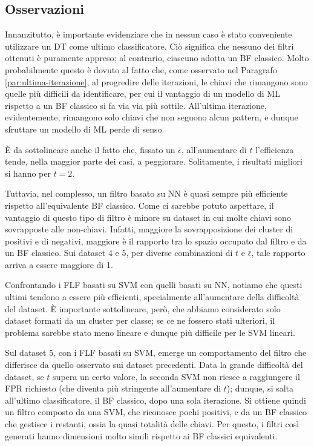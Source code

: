 \subsection{Osservazioni}

Innanzitutto, è importante evidenziare che in nessun caso è stato conveniente utilizzare un DT come ultimo classificatore. Ciò significa che nessuno dei filtri ottenuti è puramente appreso; al contrario, ciascuno adotta un BF classico. Molto probabilmente questo è dovuto al fatto che, come osservato nel Paragrafo \ref{par:ultima-iterazione}, al progredire delle iterazioni, le chiavi che rimangono sono quelle più difficili da identificare, per cui il vantaggio di un modello di ML rispetto a un BF classico si fa via via più sottile. All'ultima iterazione, evidentemente, rimangono solo chiavi che non seguono alcun pattern, e dunque sfruttare un modello di ML perde di senso.

È da sottolineare anche il fatto che, fissato un $\bar \epsilon$, all'aumentare di $t$ l'efficienza tende, nella maggior parte dei casi, a peggiorare. Solitamente, i risultati migliori si hanno per $t=2$.

Tuttavia, nel complesso, un filtro basato su NN è quasi sempre più efficiente rispetto all'equivalente BF classico. Come ci sarebbe potuto aspettare, il vantaggio di questo tipo di filtro è minore su dataset in cui molte chiavi sono sovrapposte alle non-chiavi. Infatti, maggiore la sovrapposizione dei cluster di positivi e di negativi, maggiore è il rapporto tra lo spazio occupato dal filtro e da un BF classico. Sui dataset 4 e 5, per diverse combinazioni di $t$ e $\bar \epsilon$, tale rapporto arriva a essere maggiore di 1.

Confrontando i FLF basati su SVM con quelli basati su NN, notiamo che questi ultimi tendono a essere più efficienti, specialmente all'aumentare della difficoltà del dataset.
È importante sottolineare, però, che abbiamo considerato solo dataset formati da un cluster per classe; se ce ne fossero stati ulteriori, il problema sarebbe stato meno lineare e dunque più difficile per le SVM lineari.

Sul dataset 5, con i FLF basati su SVM, emerge un comportamento del filtro che differisce da quello osservato sui dataset precedenti. Data la grande difficoltà del dataset, se $t$ supera un certo valore, la seconda SVM non riesce a raggiungere il FPR richiesto (che diventa più stringente all'aumentare di $t$); dunque, si salta all'ultimo classificatore, il BF classico, dopo una sola iterazione. Si ottiene quindi un filtro composto da una SVM, che riconosce pochi positivi, e da un BF classico che gestisce i restanti, ossia la quasi totalità delle chiavi. Per questo, i filtri così generati hanno dimensioni molto simili rispetto ai BF classici equivalenti.

